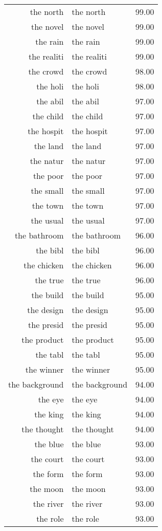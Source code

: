 \begin{table}[ht]
\begin{tabular}{rlr}
  the north & the north & 99.00 \\ 
  the novel & the novel & 99.00 \\ 
  the rain & the rain & 99.00 \\ 
  the realiti & the realiti & 99.00 \\ 
  the crowd & the crowd & 98.00 \\ 
  the holi & the holi & 98.00 \\ 
  the abil & the abil & 97.00 \\ 
  the child & the child & 97.00 \\ 
  the hospit & the hospit & 97.00 \\ 
  the land & the land & 97.00 \\ 
  the natur & the natur & 97.00 \\ 
  the poor & the poor & 97.00 \\ 
  the small & the small & 97.00 \\ 
  the town & the town & 97.00 \\ 
  the usual & the usual & 97.00 \\ 
  the bathroom & the bathroom & 96.00 \\ 
  the bibl & the bibl & 96.00 \\ 
  the chicken & the chicken & 96.00 \\ 
  the true & the true & 96.00 \\ 
  the build & the build & 95.00 \\ 
  the design & the design & 95.00 \\ 
  the presid & the presid & 95.00 \\ 
  the product & the product & 95.00 \\ 
  the tabl & the tabl & 95.00 \\ 
  the winner & the winner & 95.00 \\ 
  the background & the background & 94.00 \\ 
  the eye & the eye & 94.00 \\ 
  the king & the king & 94.00 \\ 
  the thought & the thought & 94.00 \\ 
  the blue & the blue & 93.00 \\ 
  the court & the court & 93.00 \\ 
  the form & the form & 93.00 \\ 
  the moon & the moon & 93.00 \\ 
  the river & the river & 93.00 \\ 
  the role & the role & 93.00 \\ 

\end{tabular}
\end{table}
